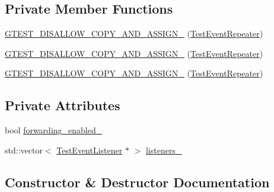 \subsection*{Private Member Functions}
\begin{DoxyCompactItemize}
\item 
\mbox{\hyperlink{classtesting_1_1internal_1_1_test_event_repeater_a882648737e85eff0986ff66b794e310a}{G\+T\+E\+S\+T\+\_\+\+D\+I\+S\+A\+L\+L\+O\+W\+\_\+\+C\+O\+P\+Y\+\_\+\+A\+N\+D\+\_\+\+A\+S\+S\+I\+G\+N\+\_\+}} (\mbox{\hyperlink{classtesting_1_1internal_1_1_test_event_repeater}{Test\+Event\+Repeater}})
\item 
\mbox{\hyperlink{classtesting_1_1internal_1_1_test_event_repeater_a882648737e85eff0986ff66b794e310a}{G\+T\+E\+S\+T\+\_\+\+D\+I\+S\+A\+L\+L\+O\+W\+\_\+\+C\+O\+P\+Y\+\_\+\+A\+N\+D\+\_\+\+A\+S\+S\+I\+G\+N\+\_\+}} (\mbox{\hyperlink{classtesting_1_1internal_1_1_test_event_repeater}{Test\+Event\+Repeater}})
\item 
\mbox{\hyperlink{classtesting_1_1internal_1_1_test_event_repeater_a882648737e85eff0986ff66b794e310a}{G\+T\+E\+S\+T\+\_\+\+D\+I\+S\+A\+L\+L\+O\+W\+\_\+\+C\+O\+P\+Y\+\_\+\+A\+N\+D\+\_\+\+A\+S\+S\+I\+G\+N\+\_\+}} (\mbox{\hyperlink{classtesting_1_1internal_1_1_test_event_repeater}{Test\+Event\+Repeater}})
\end{DoxyCompactItemize}
\subsection*{Private Attributes}
\begin{DoxyCompactItemize}
\item 
bool \mbox{\hyperlink{classtesting_1_1internal_1_1_test_event_repeater_a1f7e494642d653eaad800504510d18a3}{forwarding\+\_\+enabled\+\_\+}}
\item 
std\+::vector$<$ \mbox{\hyperlink{classtesting_1_1_test_event_listener}{Test\+Event\+Listener}} $\ast$ $>$ \mbox{\hyperlink{classtesting_1_1internal_1_1_test_event_repeater_ac45999606544592544369fa20b11bc26}{listeners\+\_\+}}
\end{DoxyCompactItemize}


\subsection{Constructor \& Destructor Documentation}
\mbox{\label{classtesting_1_1internal_1_1_test_event_repeater_a97dc3b08bd62c615f16e4c73ed0b3894}} 
